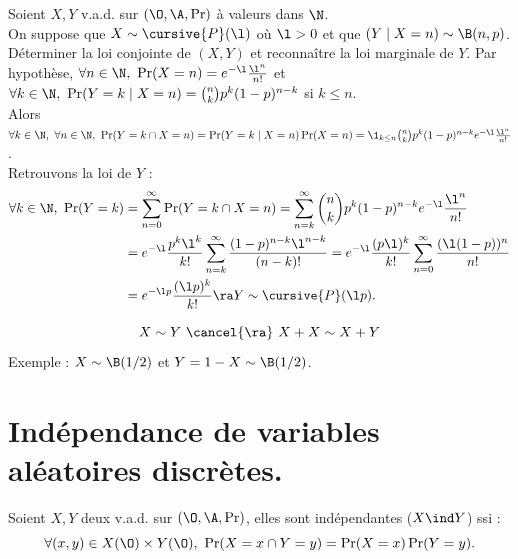 \documentclass[11pt]{article}
\begin{document}
\begin{exercice}{}{}
    Soient $X,Y$ v.a.d. sur $(\O,\A,\Pr)$ à valeurs dans $\N$.\\
    On suppose que $X\sim\cursive{P}(\l)$ où $\l>0$ et que $(Y\mid X=n)\sim \B(n,p)$.\\
    Déterminer la loi conjointe de $(X,Y)$ et reconnaître la loi marginale de $Y$.
    \tcblower
    Par hypothèse, $\forall n \in \N, ~ \Pr(X=n)=e^{-\l}\frac{\l^n}{n!}$ et $\forall k \in \N, ~ \Pr(Y=k\mid X=n)=\binom{n}{k}p^k(1-p)^{n-k}$ si $k\leq n$.\\
    Alors $\forall k \in \N, ~ \forall n \in \N, ~ \Pr(Y=k \cap X=n) = \Pr(Y=k\mid X=n)\Pr(X=n)=\1_{k\leq n}\binom{n}{k}p^k(1-p)^{n-k}e^{-\l}\frac{\l^n}{n!}$.\\
    Retrouvons la loi de $Y$ :
    \begin{align*}
        \forall k \in \N, ~ \Pr(Y=k) &= \sum_{n=0}^{\infty}\Pr(Y=k \cap X=n) = \sum_{n=k}^\infty \binom{n}{k}p^k(1-p)^{n-k} e^{-\l}\frac{\l^n}{n!}\\
        &=e^{-\l}\frac{p^k\l^k}{k!}\sum_{n=k}^{\infty}\frac{(1-p)^{n-k}\l^{n-k}}{(n-k)!} = e^{-\l}\frac{(p\l)^k}{k!}\sum_{n=0}^{\infty}\frac{(\l(1-p))^n}{n!}\\
        &=e^{-\l p}\frac{(\l p)^k}{k!} \ra Y \sim \cursive{P}(\l p).
    \end{align*}
\end{exercice}

\begin{prop}{}{}
    \begin{equation*}
        X \sim Y ~ \cancel{\ra} ~ X+X \sim X+Y
    \end{equation*}
    Exemple : $X\sim\B(1/2)$ et $Y=1-X\sim\B(1/2)$.
\end{prop}

\section{Indépendance de variables aléatoires discrètes.}

\begin{defi}{}{}
    Soient $X,Y$ deux v.a.d. sur $(\O,\A,\Pr)$, elles sont indépendantes ($X \ind Y$) ssi :
    \begin{equation*}
        \forall (x,y) \in X(\O) \times Y(\O), ~ \Pr(X = x \cap Y = y) = \Pr(X=x)\Pr(Y=y).
    \end{equation*}
\end{defi}
\end{document}
